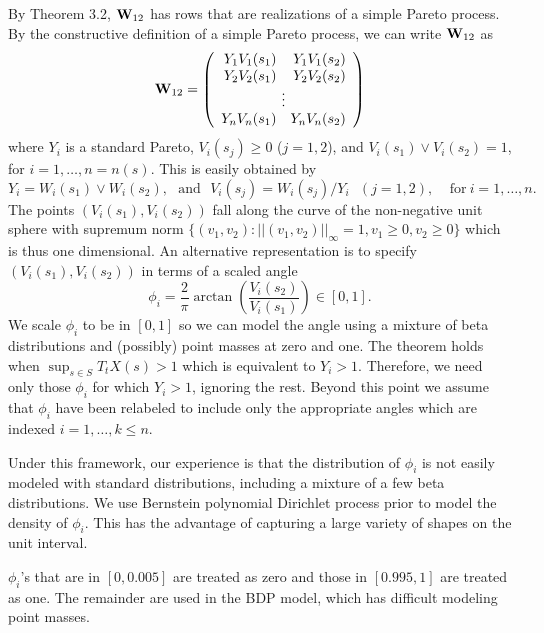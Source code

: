 By Theorem 3.2, $\mathbf{\bm{W}}_{12}$ has rows that are realizations of a simple Pareto process. By the constructive definition of a simple Pareto process, we can write $\mathbf{\bm{W}}_{12}$ as
\[ \m{W}_{12} = \left(\begin{array}{rr} Y_1V_1(s_1) & Y_1V_1(s_2) \\ Y_2V_2(s_1) & Y_2V_2(s_2) \\ \multicolumn{2}{c}{\vdots} \\ Y_nV_n(s_1) & Y_nV_n(s_2) \end{array}\right) \]
where $Y_i$ is a standard Pareto, $V_i(s_j)\geq 0$ ($j=1,2$), and $V_i(s_1) \vee V_i(s_2) = 1$, for $i=1,\ldots,n=n(s)$. This is easily obtained by
\[ Y_i = W_i(s_1) \vee W_i(s_2),~~~\mathrm{and}~~~ V_i(s_j) = W_i(s_j) / Y_i ~~~ (j=1,2),~~~~~\mathrm{for~}i=1,\ldots,n. \]
The points $(V_i(s_1), V_i(s_2))$ fall along the curve of the non-negative unit sphere with supremum norm $\{(v_1, v_2):||(v_1,v_2)||_\infty=1, v_1\geq0,v_2\geq0\}$ which is thus one dimensional. An alternative representation is to specify $(V_i(s_1), V_i(s_2))$ in terms of a scaled angle
\[ \phi_i = \frac{2}{\pi}\arctan\left(\frac{V_i(s_2)}{V_i(s_1)}\right)\in[0,1]. \]
We scale $\phi_i$ to be in $[0,1]$ so we can model the angle using a mixture of beta distributions and (possibly) point masses at zero and one. The theorem holds when $\sup_{s\in S}T_t X(s) > 1$ which is equivalent to $Y_i > 1$. Therefore, we need only those $\phi_i$ for which $Y_i>1$, ignoring the rest. Beyond this point we assume that $\phi_i$ have been relabeled to include only the appropriate angles which are indexed $i=1,\ldots,k\leq n$.

Under this framework, our experience is that the distribution of $\phi_i$ is not easily modeled with standard distributions, including a mixture of a few beta distributions. We use Bernstein polynomial Dirichlet process prior to model the density of $\phi_i$. This has the advantage of capturing a large variety of shapes on the unit interval.

$\phi_i$'s that are in $[0, 0.005]$ are treated as zero and those in $[0.995, 1]$ are treated as one. The remainder are used in the BDP model, which has difficult modeling point masses.

